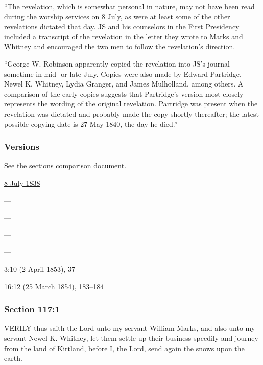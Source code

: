 			``The revelation, which is somewhat personal in nature, may not have been read during the worship services on 8	July, as were at least some of the other revelations dictated that day. JS and his counselors in the First Presidency included a transcript of the revelation in the letter they wrote to Marks and Whitney and encouraged the two men to follow the revelation's direction.
			
			``George W. Robinson apparently copied the revelation into JS's journal sometime in mid- or late July. Copies were also made by Edward Partridge, Newel K. Whitney, Lydia Granger, and James Mulholland, among others. A comparison of the early copies suggests that Partridge's version most closely represents the wording of the original revelation. Partridge was present when the revelation was dictated and probably made the copy shortly thereafter; the latest possible copying date is 27 May 1840, the day he died.''
					
	\subsubsection{Versions}
		\label{DC117-V}
		
		See the \href{https://drive.google.com/file/d/1goAvNz8jS4R8slYfMG_db55Ty2z_vmgK/view?usp=sharing}{sections comparison} document.
	
		\begin{compactdesc}
			\item[JSP] \hyperref[EMS-1838-JS-8-JUL-1838-E]{8 July 1838}
			\item[BC] ---
			\item[DC 1835] ---
			\item[DC 1844] ---
			\item[TS] ---
			\item[DN] 3:10 (2 April 1853), 37
			\item[MS] 16:12 (25 March 1854), 183--184
		\end{compactdesc}

	\subsubsection{Section 117:1} %
		\label{DC117-1}

		VERILY thus saith the Lord unto my servant William Marks, and also unto my servant Newel K. Whitney, let them settle up their business speedily and journey from the land of Kirtland, before I, the Lord, send again the snows upon the earth.

